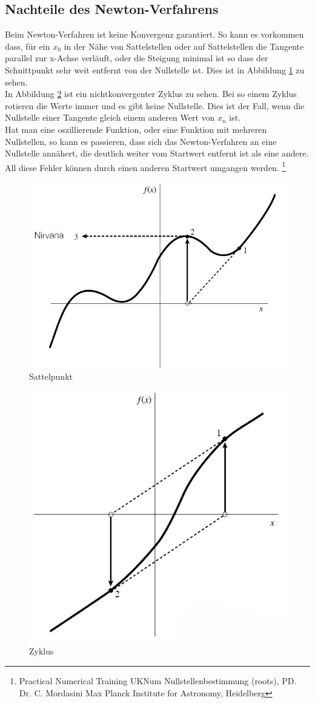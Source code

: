 \documentclass[a4paper,12pt,fleqn,oneside]{article}
\begin{document}
	\subsection{Nachteile des Newton-Verfahrens}
		Beim Newton-Verfahren ist keine Konvergenz garantiert. So kann es vorkommen dass, für ein $x_0$ in der Nähe von Sattelstellen oder auf
		Sattelstellen die Tangente parallel zur x-Achse verläuft, oder die Steigung minimal ist so dass der Schnittpunkt sehr weit entfernt von der
		Nullstelle ist. Dies ist in Abbildung \ref{fig:sattelstelle} zu sehen.\\
		In Abbildung \ref{fig:ring} ist ein nichtkonvergenter Zyklus zu sehen. Bei so einem Zyklus rotieren die Werte immer und es gibt keine Nullstelle.
		Dies ist der Fall, wenn die Nullstelle einer Tangente gleich einem anderen Wert von $x_n$ ist.\\
		Hat man eine oszillierende  Funktion, oder eine Funktion mit mehreren Nullstellen, so kann es passieren, dass sich das Newton-Verfahren an eine
		Nullstelle annähert, die deutlich weiter vom Startwert entfernt ist als eine andere.\\
		All diese Fehler können durch einen anderen Startwert umgangen werden.
		\footnote{Practical Numerical Training UKNum Nullstellenbestimmung (roots), PD. Dr. C. Mordasini Max Planck Institute for Astronomy, Heidelberg}

		\begin{figure}
			\centering
			\includegraphics[width=0.5\linewidth]{Sattelstelle.png}
			\caption{Sattelpunkt}
			\label{fig:sattelstelle}
		\end{figure}
		
		\begin{figure}
			\centering
			\includegraphics[width=0.5\linewidth]{Ring.png}
			\caption{Zyklus}
			\label{fig:ring}
		\end{figure}
		
\end{document}
